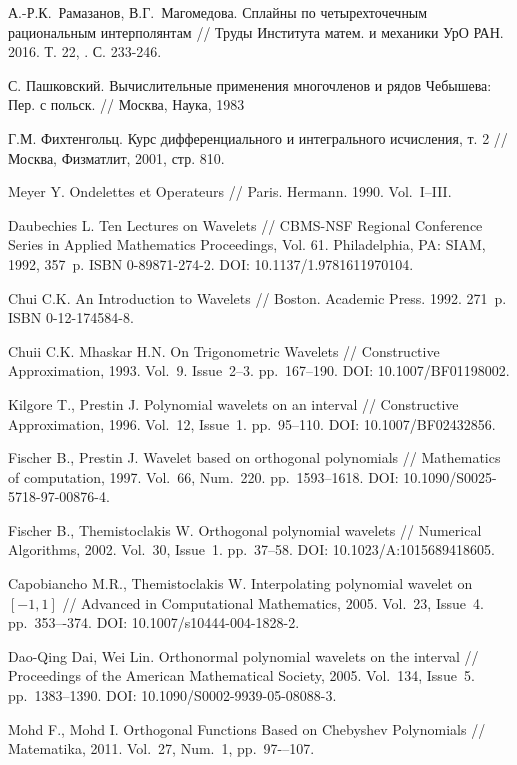 \begin{thebibliography}{999}
 А.-Р.К.~Рамазанов, В.Г.~Магомедова. Сплайны по четырехточечным рациональным интерполянтам //
Труды Института матем. и механики УрО РАН. 2016. Т. 22, . С. 233-246.


 С. Пашковский. Вычислительные применения многочленов и рядов Чебышева: Пер. с польск. // Москва, Наука, 1983

 Г.М. Фихтенгольц. Курс дифференциального и интегрального исчисления, т. 2 // Москва, Физматлит, 2001, стр. 810.



 Meyer Y. Ondelettes et Operateurs // Paris. Hermann. 1990. Vol.~I–III.


 Daubechies L. Ten Lectures on Wavelets // CBMS-NSF Regional Conference Series in Applied Mathematics Proceedings,
Vol. 61. Philadelphia, PA: SIAM, 1992, 357~p. ISBN 0-89871-274-2. DOI: 10.1137/1.9781611970104.


 Chui C.K. An Introduction to  Wavelets // Boston. Academic Press. 1992. 271~p. ISBN 0-12-174584-8.


 Chuii C.K. Mhaskar H.N. On Trigonometric Wavelets // Constructive Approximation, 1993. Vol.~9. Issue~2--3. pp.~167--190. DOI: 10.1007/BF01198002.


 Kilgore T., Prestin J. Polynomial wavelets on an interval // Constructive Approximation, 1996. Vol.~12, Issue~1. pp.~95--110. DOI: 10.1007/BF02432856.


 Fischer B., Prestin J. Wavelet based on orthogonal polynomials // Mathematics of computation, 1997. Vol.~66, Num.~220. pp.~1593--1618. DOI: 10.1090/S0025-5718-97-00876-4.


 Fischer B., Themistoclakis W. Orthogonal polynomial wavelets // Numerical Algorithms, 2002. Vol.~30, Issue~1. pp.~37--58. DOI: 10.1023/A:1015689418605.


 Capobiancho M.R., Themistoclakis W. Interpolating polynomial wavelet on $[-1,1]$ // Advanced in Computational Mathematics, 2005. Vol.~23, Issue~4. pp.~353–-374. DOI: 10.1007/s10444-004-1828-2.


 Dao-Qing Dai, Wei Lin. Orthonormal polynomial wavelets on the interval // Proceedings of the American Mathematical Society, 2005. Vol.~134, Issue~5. pp.~1383–1390. DOI: 10.1090/S0002-9939-05-08088-3.


 Mohd F., Mohd I. Orthogonal Functions Based on Chebyshev Polynomials // Matematika, 2011. Vol.~27, Num.~1, pp.~97-–107.



\end{thebibliography}
